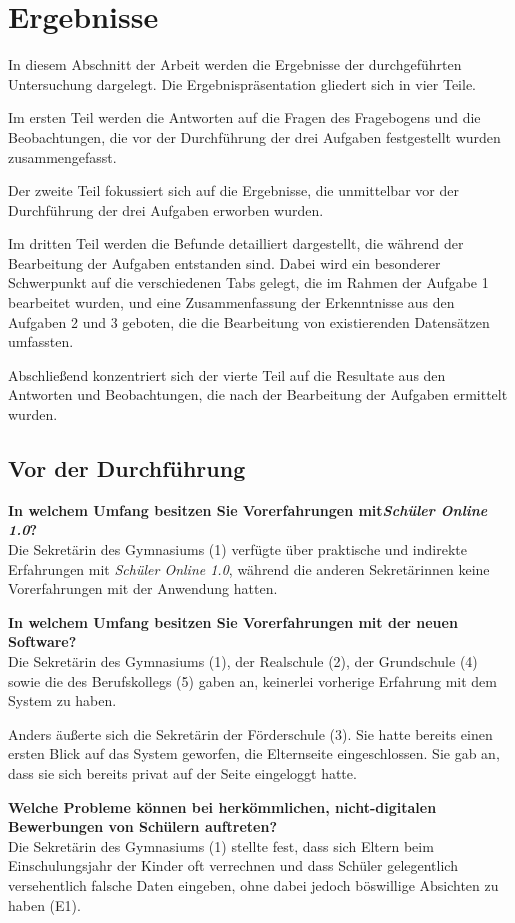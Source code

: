 \section{Ergebnisse}
In diesem Abschnitt der Arbeit werden die Ergebnisse der durchgeführten Untersuchung dargelegt. Die Ergebnispräsentation gliedert sich in vier Teile.

Im ersten Teil werden die Antworten auf die Fragen des Fragebogens und die Beobachtungen, die vor der Durchführung der drei Aufgaben festgestellt wurden zusammengefasst.

Der zweite Teil fokussiert sich auf die Ergebnisse, die unmittelbar vor der Durchführung der drei Aufgaben erworben wurden.

Im dritten Teil werden die Befunde detailliert dargestellt, die während der Bearbeitung der Aufgaben entstanden sind. Dabei wird ein besonderer Schwerpunkt auf die verschiedenen Tabs gelegt, die im Rahmen der Aufgabe 1 bearbeitet wurden, und eine Zusammenfassung der Erkenntnisse aus den Aufgaben 2 und 3 geboten, die die Bearbeitung von existierenden Datensätzen umfassten.

Abschließend konzentriert sich der vierte Teil auf die Resultate aus den Antworten und Beobachtungen, die nach der Bearbeitung der Aufgaben ermittelt wurden.

\subsection{Vor der Durchführung}
\textbf{In welchem Umfang besitzen Sie Vorerfahrungen mit\textit{Schüler Online 1.0}?}\\
Die Sekretärin des Gymnasiums (1) verfügte über praktische und indirekte Erfahrungen mit \textit{Schüler Online 1.0}, während die anderen Sekretärinnen keine Vorerfahrungen mit der Anwendung hatten.

\textbf{In welchem Umfang besitzen Sie Vorerfahrungen mit der neuen Software?}\\
Die Sekretärin des Gymnasiums (1), der Realschule (2), der Grundschule (4) sowie die des Berufskollegs (5) gaben an, keinerlei vorherige Erfahrung mit dem System zu haben.

Anders äußerte sich die Sekretärin der Förderschule (3). Sie hatte bereits einen ersten Blick auf das System geworfen, die Elternseite eingeschlossen. Sie gab an, dass sie sich bereits privat auf der Seite eingeloggt hatte.

\textbf{Welche Probleme können bei herkömmlichen, nicht-digitalen Bewerbungen von Schülern auftreten?}\\
Die Sekretärin des Gymnasiums (1) stellte fest, dass sich Eltern beim Einschulungsjahr der Kinder oft verrechnen und dass Schüler gelegentlich versehentlich falsche Daten eingeben, ohne dabei jedoch \glqq böswillige\grqq{} Absichten zu haben (E1). 

